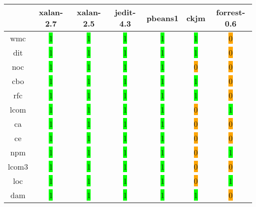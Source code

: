 \begin{table}[H]
\centering
    \begin{tabular}{|c|c|c|c|c|c|c|}
        \hline
         & xalan-2.7 & xalan-2.5 & jedit-4.3 & pbeans1 & ckjm & forrest-0.6 \\ \hline
        \acrshort{wmc} & \colorbox{lime}{1} & \colorbox{lime}{1} & \colorbox{lime}{1} & \colorbox{lime}{1} & \colorbox{lime}{1} & \colorbox{orange}{0} \\ \hline
        \acrshort{dit} & \colorbox{lime}{1} & \colorbox{lime}{1} & \colorbox{lime}{1} & \colorbox{lime}{1} & \colorbox{lime}{1} & \colorbox{orange}{0} \\ \hline
        \acrshort{noc} & \colorbox{lime}{1} & \colorbox{lime}{1} & \colorbox{lime}{1} & \colorbox{lime}{1} & \colorbox{orange}{0} & \colorbox{orange}{0} \\ \hline
        \acrshort{cbo} & \colorbox{lime}{1} & \colorbox{lime}{1} & \colorbox{lime}{1} & \colorbox{lime}{1} & \colorbox{lime}{1} & \colorbox{orange}{0} \\ \hline
        \acrshort{rfc} & \colorbox{lime}{1} & \colorbox{lime}{1} & \colorbox{lime}{1} & \colorbox{lime}{1} & \colorbox{lime}{1} & \colorbox{orange}{0} \\ \hline
        \acrshort{lcom} & \colorbox{lime}{1} & \colorbox{lime}{1} & \colorbox{lime}{1} & \colorbox{lime}{1} & \colorbox{orange}{0} & \colorbox{lime}{1} \\ \hline
        \acrshort{ca} & \colorbox{lime}{1} & \colorbox{lime}{1} & \colorbox{lime}{1} & \colorbox{lime}{1} & \colorbox{orange}{0} & \colorbox{orange}{0} \\ \hline
        \acrshort{ce} & \colorbox{lime}{1} & \colorbox{lime}{1} & \colorbox{lime}{1} & \colorbox{lime}{1} & \colorbox{orange}{0} & \colorbox{orange}{0} \\ \hline
        \acrshort{npm} & \colorbox{lime}{1} & \colorbox{lime}{1} & \colorbox{lime}{1} & \colorbox{lime}{1} & \colorbox{orange}{0} & \colorbox{lime}{1} \\ \hline
        \acrshort{lcom3} & \colorbox{lime}{1} & \colorbox{lime}{1} & \colorbox{lime}{1} & \colorbox{lime}{1} & \colorbox{orange}{0} & \colorbox{orange}{0} \\ \hline
        \acrshort{loc} & \colorbox{lime}{1} & \colorbox{lime}{1} & \colorbox{lime}{1} & \colorbox{lime}{1} & \colorbox{orange}{0} & \colorbox{lime}{1} \\ \hline
        \acrshort{dam} & \colorbox{lime}{1} & \colorbox{lime}{1} & \colorbox{lime}{1} & \colorbox{lime}{1} & \colorbox{lime}{1} & \colorbox{orange}{0} \\ \hline

\end{tabular}
\end{table}
